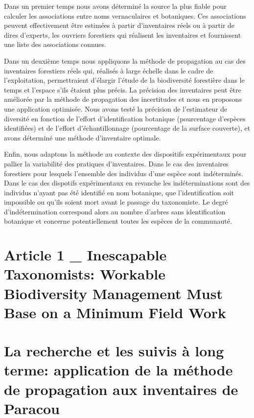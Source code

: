 \documentclass[11pt,french,A4paper,extrafontsizes,onecolumn,openright]{memoir}
\begin{document}
Dans un premier temps nous avons déterminé la source la plus fiable pour
calculer les associations entre noms vernaculaires et botaniques. Ces
associations peuvent effectivement être estimées à partir d'inventaires
réels ou à partir de dires d'experts, les ouvriers forestiers qui
réalisent les inventaires et fournissent une liste des associations
connues.

Dans un deuxième temps nous appliquons la méthode de propagation au cas
des inventaires forestiers réels qui, réalisés à large échelle dans le
cadre de l'exploitation, permettraient d'élargir l'étude de la
biodiversité forestière dans le temps et l'espace s'ils étaient plus
précis. La précision des inventaires peut être améliorée par la méthode
de propagation des incertitudes et nous en proposons une application
optimisée. Nous avons testé la précision de l'estimateur de diversité en
fonction de l'effort d'identification botanique (pourcentage d'espèces
identifiées) et de l'effort d'échantillonnage (pourcentage de la surface
couverte), et avons déterminé une méthode d'inventaire optimale.

Enfin, nous adaptons la méthode au contexte des dispositifs
expérimentaux pour pallier la variabilité des pratiques d'inventaires.
Dans le cas des inventaires forestiers pour lesquels l'ensemble des
individus d'une espèce sont indéterminés. Dans le cas des dispotifs
expérimentaux en revanche les indéterminations sont des individus
n'ayant pas été identifié en nom botanique, que l'identification soit
impossible ou qu'ils soient mort avant le passage du taxonomiste. Le
degré d'indétermination correspond alors au nombre d'arbres sans
identification botanique et concerne potentiellement toutes les espèces
de la communauté.

\section{Article 1 \_ Inescapable Taxonomists: Workable Biodiversity
Management Must Base on a Minimum Field
Work}\label{article-1-_-inescapable-taxonomists-workable-biodiversity-management-must-base-on-a-minimum-field-work}

\section{La recherche et les suivis à long terme: application de la
méthode de propagation aux inventaires de
Paracou}\label{la-recherche-et-les-suivis-a-long-terme-application-de-la-methode-de-propagation-aux-inventaires-de-paracou}
\end{document}
